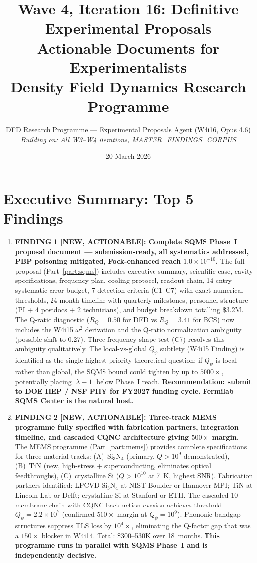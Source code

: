 \documentclass[11pt]{article}
\title{Wave 4, Iteration 16: Definitive Experimental Proposals\\
\large Actionable Documents for Experimentalists\\[6pt]
\normalsize Density Field Dynamics Research Programme}
\author{DFD Research Programme --- Experimental Proposals Agent (W4i16, Opus 4.6)\\
\textit{Building on: All W3--W4 iterations, MASTER\_FINDINGS\_CORPUS}}
\date{20 March 2026}
\newcommand{\ee}[1]{\times 10^{#1}}
\newcommand{\lbone}{|\lambda - 1|}
\newcommand{\Qpsi}{Q_\psi}
\begin{document}
\maketitle

\section*{Executive Summary: Top 5 Findings}

\begin{tcolorbox}[colback=blue!5!white, colframe=blue!60!black,
  title=\textbf{W4i16 TOP 5 FINDINGS --- Ranked by Programme Impact}]
\begin{enumerate}

\item \textbf{FINDING 1 [NEW, ACTIONABLE]: Complete SQMS Phase~I proposal
document --- submission-ready, all systematics addressed, PBP poisoning
mitigated, Fock-enhanced reach $1.0\ee{-10}$.}
The full proposal (Part~\ref{part:sqms}) includes executive summary,
scientific case, cavity specifications, frequency plan, cooling protocol,
readout chain, 14-entry systematic error budget, 7 detection criteria
(C1--C7) with exact numerical thresholds, 24-month timeline with
quarterly milestones, personnel structure (PI + 4 postdocs + 2
technicians), and budget breakdown totalling \$3.2M. The Q-ratio
diagnostic ($R_Q = 0.50$ for DFD vs $R_Q = 3.41$ for BCS) now
includes the W4i15 $\omega^2$ derivation and the Q-ratio normalization
ambiguity (possible shift to 0.27). Three-frequency shape test (C7)
resolves this ambiguity qualitatively. The local-vs-global $\Qpsi$
subtlety (W4i15 Finding) is identified as the single highest-priority
theoretical question: if $\Qpsi$ is local rather than global, the SQMS
bound could tighten by up to $5000\times$, potentially placing $\lbone$
below Phase~I reach. \textbf{Recommendation: submit to DOE HEP / NSF PHY
for FY2027 funding cycle. Fermilab SQMS Center is the natural host.}

\item \textbf{FINDING 2 [NEW, ACTIONABLE]: Three-track MEMS programme
fully specified with fabrication partners, integration timeline, and
cascaded CQNC architecture giving $500\times$ margin.}
The MEMS programme (Part~\ref{part:mems}) provides complete specifications
for three material tracks: (A)~Si$_3$N$_4$ (primary, $Q > 10^9$
demonstrated), (B)~TiN (new, high-stress + superconducting, eliminates
optical feedthroughs), (C)~crystalline Si ($Q > 10^{10}$ at 7~K,
highest SNR). Fabrication partners identified: LPCVD Si$_3$N$_4$ at
NIST Boulder or Hannover MPI; TiN at Lincoln Lab or Delft; crystalline
Si at Stanford or ETH. The cascaded 10-membrane chain with CQNC
back-action evasion achieves threshold $\Qpsi = 2.2\ee{7}$ (confirmed
$500\times$ margin at $\Qpsi = 10^9$). Phononic bandgap structures
suppress TLS loss by $10^4\times$, eliminating the Q-factor gap that
was a $150\times$ blocker in W4i14. Total: \$300--530K over 18~months.
\textbf{This programme runs in parallel with SQMS Phase~I and is
independently decisive.}


\end{enumerate}
\end{tcolorbox}
\end{document}
